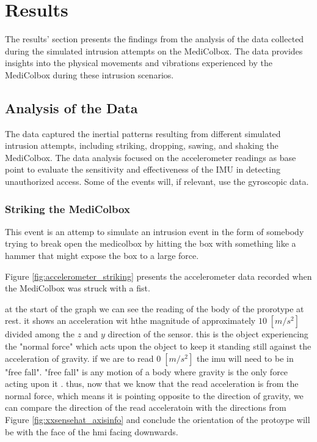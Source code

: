 \documentclass[../main.tex]{subfiles}
\begin{document}
\section{Results}
The results' section presents the findings from the analysis of
the data collected during the simulated intrusion attempts
on the MediColbox.
The data provides insights into the physical movements
and vibrations experienced by the MediColbox during these intrusion scenarios.

\subsection{Analysis of the Data}

The data captured the inertial patterns resulting from different simulated intrusion attempts, including striking, dropping, sawing, and shaking the MediColbox.
The data analysis focused on the accelerometer readings as base point to evaluate the sensitivity and effectiveness of the IMU in detecting unauthorized access. Some of the events will, if relevant, use the gyroscopic data.

\vspace{30px}

\subsubsection{Striking the MediColbox}

This event is an attemp to simulate an intrusion event in the form of
somebody trying to break open the \gls{medicolbox} by hitting the box with something like a hammer that might expose the box to a large force.

Figure \ref{fig:accelerometer_striking} presents the
accelerometer data recorded when the MediColbox was
struck with a fist.

at the start of the graph we can see the reading of the body of the prorotype at rest. it shows an acceleration wit hthe magnitude of approximately $10\;[m/s^2]$ divided among the $z$ and $y$ direction of the sensor. this is the object experiencing the "normal force" which acts upon the object to keep it standing still against the acceleration of gravity. if we are to read $0\;[m/s^2]$ the \gls{imu} will need to be in "free fall". "free fall" is any motion of a body where gravity is the only force acting upon it \cite{Freefall_Encyclopædia_Britannica_2024}. thus, now that we know that the read acceleration is from the normal force, which means it is pointing opposite to the direction of gravity, we can compare the direction of the read acceleratoin with the directions from Figure \ref{fig:xxsensehat_axisinfo} and conclude the orientation of the protoype will be with the face of the \gls{hmi} facing downwards.
\end{document}
